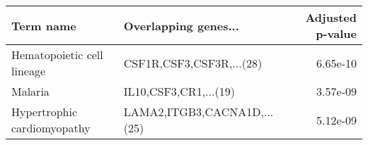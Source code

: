 \begin{tabular}{llr}
\toprule
                  Term name &        Overlapping genes... &  Adjusted p-value \\
\midrule
 Hematopoietic cell lineage &    CSF1R,CSF3,CSF3R,...(28) &          6.65e-10 \\
                    Malaria &       IL10,CSF3,CR1,...(19) &          3.57e-09 \\
Hypertrophic cardiomyopathy & LAMA2,ITGB3,CACNA1D,...(25) &          5.12e-09 \\
\bottomrule
\end{tabular}
